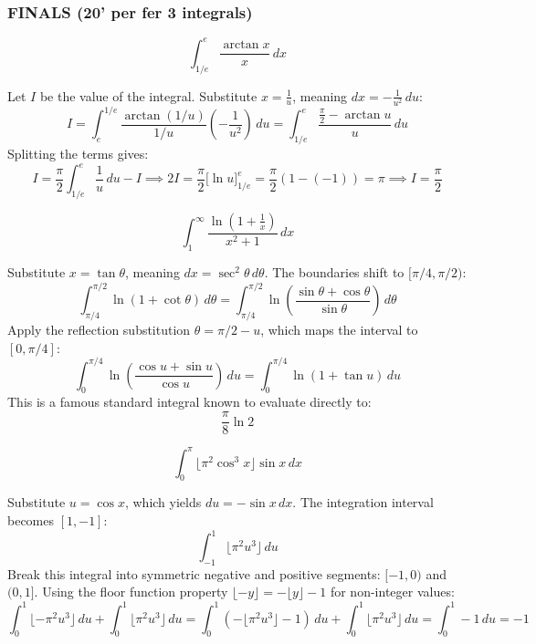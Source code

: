 \subsubsection*{FINALS (20' per fer 3 integrals)}
\begin{questions}

    \question \[ \int_{1/e}^{e} \frac{\arctan x}{x} \,dx \]
    \begin{solution}
        Let $I$ be the value of the integral. Substitute $x = \frac{1}{u}$, meaning $dx = -\frac{1}{u^2} \,du$:
        \[ I = \int_{e}^{1/e} \frac{\arctan(1/u)}{1/u} \left(-\frac{1}{u^2}\right) \,du = \int_{1/e}^{e} \frac{\frac{\pi}{2} - \arctan u}{u} \,du \]
        Splitting the terms gives:
        \[ I = \frac{\pi}{2} \int_{1/e}^{e} \frac{1}{u} \,du - I \implies 2I = \frac{\pi}{2} \Big[ \ln u \Big]_{1/e}^e = \frac{\pi}{2}(1 - (-1)) = \pi \implies I = \frac{\pi}{2} \]
    \end{solution}

    \question \[ \int_{1}^{\infty} \frac{\ln(1 + \frac{1}{x})}{x^2 + 1} \,dx \]
    \begin{solution}
        Substitute $x = \tan\theta$, meaning $dx = \sec^2\theta \,d\theta$. The boundaries shift to $[\pi/4, \pi/2)$:
        \[ \int_{\pi/4}^{\pi/2} \ln(1 + \cot\theta) \,d\theta = \int_{\pi/4}^{\pi/2} \ln\left(\frac{\sin\theta + \cos\theta}{\sin\theta}\right) \,d\theta \]
        Apply the reflection substitution $\theta = \pi/2 - u$, which maps the interval to $[0, \pi/4]$:
        \[ \int_{0}^{\pi/4} \ln\left(\frac{\cos u + \sin u}{\cos u}\right) \,du = \int_{0}^{\pi/4} \ln(1 + \tan u) \,du \]
        This is a famous standard integral known to evaluate directly to:
        \[ \frac{\pi}{8}\ln 2 \]
    \end{solution}

    \question \[ \int_{0}^{\pi} \lfloor \pi^2 \cos^3 x \rfloor \sin x \,dx \]
    \begin{solution}
        Substitute $u = \cos x$, which yields $du = -\sin x \,dx$. The integration interval becomes $[1, -1]$:
        \[ \int_{-1}^{1} \lfloor \pi^2 u^3 \rfloor \,du \]
        Break this integral into symmetric negative and positive segments: $[-1, 0)$ and $(0, 1]$. Using the floor function property $\lfloor -y \rfloor = -\lfloor y \rfloor - 1$ for non-integer values:
        \[ \int_{0}^{1} \lfloor -\pi^2 u^3 \rfloor \,du + \int_{0}^{1} \lfloor \pi^2 u^3 \rfloor \,du = \int_{0}^{1} \left( -\lfloor \pi^2 u^3 \rfloor - 1 \right) \,du + \int_{0}^{1} \lfloor \pi^2 u^3 \rfloor \,du = \int_{0}^{1} -1 \,du = -1 \]
    \end{solution}


\end{questions}

